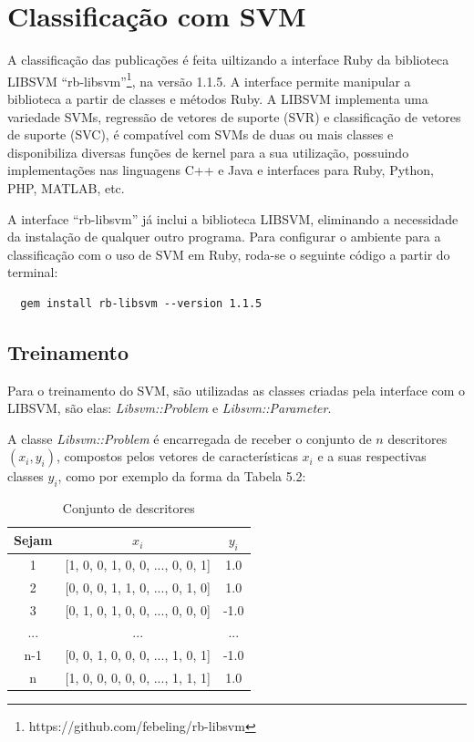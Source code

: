 \section{Classificação com SVM}

A classificação das publicações é feita uiltizando a interface Ruby da biblioteca LIBSVM ``rb-libsvm''\footnote{https://github.com/febeling/rb-libsvm}, na versão 1.1.5. A interface permite manipular a biblioteca a partir de classes e métodos Ruby. A LIBSVM implementa uma variedade SVMs, regressão de vetores de suporte (SVR) e classificação de vetores de suporte (SVC), é compatível com SVMs de duas ou mais classes e disponibiliza diversas funções de kernel para a sua utilização, possuindo implementações nas linguagens C++ e Java e interfaces para Ruby, Python, PHP, MATLAB, etc.

A interface ``rb-libsvm'' já inclui a biblioteca LIBSVM, eliminando a necessidade da instalação de qualquer outro programa. Para configurar o ambiente para a classificação com o uso de SVM em Ruby, roda-se o seguinte código a partir do terminal:

\begin{lstlisting}
  gem install rb-libsvm --version 1.1.5
\end{lstlisting}

\subsection*{Treinamento}

Para o treinamento do SVM, são utilizadas as classes criadas pela interface com o LIBSVM, são elas: \textit{Libsvm::Problem} e \textit{Libsvm::Parameter}.

A classe \textit{Libsvm::Problem} é encarregada de receber o conjunto de $n$ descritores $({x}_{i}, {y}_{i})$, compostos pelos vetores de características ${x}_{i}$ e a suas respectivas classes ${y}_{i}$, como por exemplo da forma da Tabela 5.2:

\begin{table}[ht]
  \caption{Conjunto de descritores}
  \centering
  \begin{tabular}{| c | c | c |}
    \hline
    \textbf{Sejam} & \textbf{${x}_{i}$} & \textbf{${y}_{i}$} \\ [0.5ex] \hline \hline
    1 & [1, 0, 0, 1, 0, 0, ..., 0, 0, 1] & 1.0 \\ \hline
    2 & [0, 0, 0, 1, 1, 0, ..., 0, 1, 0] & 1.0 \\ \hline
    3 & [0, 1, 0, 1, 0, 0, ..., 0, 0, 0] & -1.0 \\ \hline
    ... & ... & ... \\ \hline
    n-1 & [0, 0, 1, 0, 0, 0, ..., 1, 0, 1] & -1.0 \\ \hline
    n & [1, 0, 0, 0, 0, 0, ..., 1, 1, 1] & 1.0 \\ \hline
    \hline
  \end{tabular}
  \label{table:nonlin}
\end{table}

